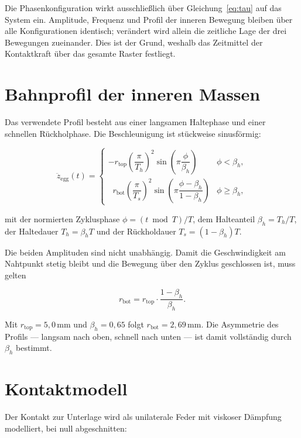\documentclass[12pt,a4paper]{report}
\begin{document}
Die Phasenkonfiguration wirkt ausschließlich über
Gleichung~\eqref{eq:tau} auf das System ein. Amplitude, Frequenz und
Profil der inneren Bewegung bleiben über alle Konfigurationen identisch;
verändert wird allein die zeitliche Lage der drei Bewegungen zueinander.
Dies ist der Grund, weshalb das Zeitmittel der Kontaktkraft über das
gesamte Raster festliegt.

\section{Bahnprofil der inneren Massen}

Das verwendete Profil besteht aus einer langsamen Haltephase und einer
schnellen Rückholphase. Die Beschleunigung ist stückweise sinusförmig:

\begin{equation}
\ddot{z}_{\mathrm{egg}}(t) =
\begin{cases}
-r_{\mathrm{top}}\left(\dfrac{\pi}{T_h}\right)^{2}
 \sin\!\left(\pi \dfrac{\phi}{\beta_h}\right)
 & \phi < \beta_h,\\[2.2ex]
\;\;r_{\mathrm{bot}}\left(\dfrac{\pi}{T_s}\right)^{2}
 \sin\!\left(\pi \dfrac{\phi-\beta_h}{1-\beta_h}\right)
 & \phi \geq \beta_h,
\end{cases}
\label{eq:eggprofil}
\end{equation}

mit der normierten Zyklusphase $\phi = (t \bmod T)/T$, dem Halteanteil
$\beta_h = T_h/T$, der Haltedauer $T_h = \beta_h T$ und der Rückholdauer
$T_s = (1-\beta_h)T$.

Die beiden Amplituden sind nicht unabhängig. Damit die Geschwindigkeit am
Nahtpunkt stetig bleibt und die Bewegung über den Zyklus geschlossen ist,
muss gelten

\begin{equation}
r_{\mathrm{bot}} = r_{\mathrm{top}} \cdot \frac{1-\beta_h}{\beta_h}.
\label{eq:c1}
\end{equation}

Mit $r_{\mathrm{top}} = 5{,}0\,\mathrm{mm}$ und $\beta_h = 0{,}65$ folgt
$r_{\mathrm{bot}} = 2{,}69\,\mathrm{mm}$. Die Asymmetrie des Profils ---
langsam nach oben, schnell nach unten --- ist damit vollständig durch
$\beta_h$ bestimmt.

\section{Kontaktmodell}

Der Kontakt zur Unterlage wird als unilaterale Feder mit viskoser
Dämpfung modelliert, bei null abgeschnitten:
\end{document}
